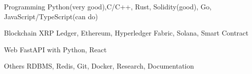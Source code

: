 


\begin{cvskills}


\cvskill
{Programming} %
{Python(very good),C/C++, Rust, Solidity(good), Go, JavaScript/TypeScript(can do)} %


\cvskill
{Blockchain} %
{XRP Ledger, Ethereum, Hyperledger Fabric, Solana, Smart Contract} %


\cvskill
{Web} %
{FastAPI with Python, React} %


\cvskill
{Others} %
{RDBMS, Redis, Git, Docker, Research, Documentation} %


\end{cvskills}